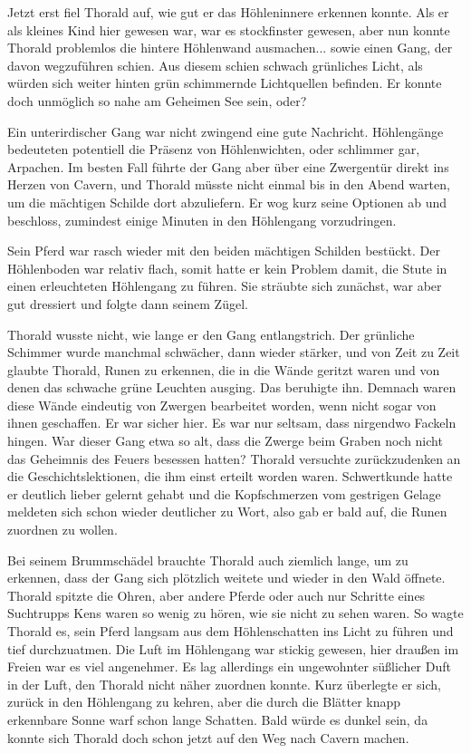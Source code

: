 Jetzt erst fiel Thorald auf, wie gut er das Höhleninnere erkennen konnte. Als er als kleines Kind hier gewesen war, war es stockfinster gewesen, aber nun konnte Thorald problemlos die hintere Höhlenwand ausmachen... sowie einen Gang, der davon wegzuführen schien. Aus diesem schien schwach grünliches Licht, als würden sich weiter hinten grün schimmernde Lichtquellen befinden. Er konnte doch unmöglich so nahe am Geheimen See sein, oder?

Ein unterirdischer Gang war nicht zwingend eine gute Nachricht. Höhlengänge bedeuteten potentiell die Präsenz von Höhlenwichten, oder schlimmer gar, Arpachen. Im besten Fall führte der Gang aber über eine Zwergentür direkt ins Herzen von Cavern, und Thorald müsste nicht einmal bis in den Abend warten, um die mächtigen Schilde dort abzuliefern. Er wog kurz seine Optionen ab und beschloss, zumindest einige Minuten in den Höhlengang vorzudringen.

Sein Pferd war rasch wieder mit den beiden mächtigen Schilden bestückt. Der Höhlenboden war relativ flach, somit hatte er kein Problem damit, die Stute in einen erleuchteten Höhlengang zu führen. Sie sträubte sich zunächst, war aber gut dressiert und folgte dann seinem Zügel.

Thorald wusste nicht, wie lange er den Gang entlangstrich. Der grünliche Schimmer wurde manchmal schwächer, dann wieder stärker, und von Zeit zu Zeit glaubte Thorald, Runen zu erkennen, die in die Wände geritzt waren und von denen das schwache grüne Leuchten ausging. Das beruhigte ihn. Demnach waren diese Wände eindeutig von Zwergen bearbeitet worden, wenn nicht sogar von ihnen geschaffen. Er war sicher hier. Es war nur seltsam, dass nirgendwo Fackeln hingen. War dieser Gang etwa so alt, dass die Zwerge beim Graben noch nicht das Geheimnis des Feuers besessen hatten? Thorald versuchte zurückzudenken an die Geschichtslektionen, die ihm einst erteilt worden waren. Schwertkunde hatte er deutlich lieber gelernt gehabt und die Kopfschmerzen vom gestrigen Gelage meldeten sich schon wieder deutlicher zu Wort, also gab er bald auf, die Runen zuordnen zu wollen.


Bei seinem Brummschädel brauchte Thorald auch ziemlich lange, um zu erkennen, dass der Gang sich plötzlich weitete und wieder in den Wald öffnete. Thorald spitzte die Ohren, aber andere Pferde oder auch nur Schritte eines Suchtrupps Kens waren so wenig zu hören, wie sie nicht zu sehen waren. So wagte Thorald es, sein Pferd langsam aus dem Höhlenschatten ins Licht zu führen und tief durchzuatmen. Die Luft im Höhlengang war stickig gewesen, hier draußen im Freien war es viel angenehmer. Es lag allerdings ein ungewohnter süßlicher Duft in der Luft, den Thorald nicht näher zuordnen konnte. Kurz überlegte er sich, zurück in den Höhlengang zu kehren, aber die durch die Blätter knapp erkennbare Sonne warf schon lange Schatten. Bald würde es dunkel sein, da konnte sich Thorald doch schon jetzt auf den Weg nach Cavern machen.


